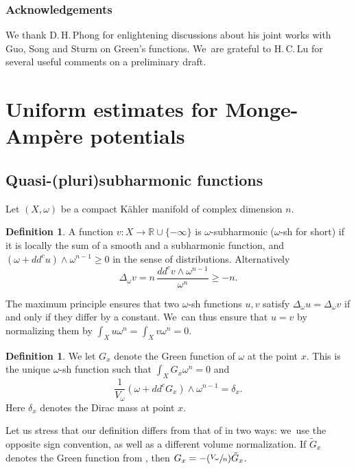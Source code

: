 \documentclass[10pt]{amsart}
\newcommand{\Psfrac}[2]{(\sfrac{#1}{#2})}
\theoremstyle{definition}
\newtheorem{defi}[theorem]{Definition}
\newcommand{\R}{\mathbb R}
\begin{document}
\subsubsection*{Acknowledgements}
We thank D.\,H.\,Phong for enlightening discussions about his joint works with Guo, Song and Sturm on Green's functions. We~are grateful to H.\,C.\,Lu for several useful comments on a preliminary draft.

\section{Uniform estimates for Monge-Ampère potentials}

\subsection{Quasi-(pluri)subharmonic functions}

Let $(X, \omega)$ be a compact Kähler manifold of complex dimension $n$.


\begin{defi}
A function $v:X \rightarrow \R \cup \{-\infty\}$
is $\omega$-subharmonic ($\omega$-sh for short) if it is locally the sum of a smooth and a subharmonic function, and
$(\omega+dd^c u) \wedge \omega^{n-1} \geq 0$ in the sense of distributions.
Alternatively
\[
\Delta_{\omega} v=n\, \frac{dd^c v \wedge \omega^{n-1}}{\omega^n} \geq -n.
\]
\end{defi}

The maximum principle ensures that two $\omega$-sh functions $u,v$ satisfy $\Delta_{\omega} u=\Delta_{\omega} v$ if and only if they differ by a constant. We~can thus ensure that $u=v$ by normalizing them
by $\int_X u \omega^n=\int_X v \omega^n=0$.

\begin{defi} \label{def:green}
We let $G_x$ denote the Green function of $\omega$ at the point $x$.
This is the unique $\omega$-sh function such that $\int_X G_x \omega^n=0$ and
\[
\frac{1}{V_{\omega}} (\omega+dd^c G_x) \wedge \omega^{n-1}=\delta_x.
\]
Here $\delta_x$ denotes the Dirac mass at point $x$.
\end{defi}

Let us stress that our definition differs from that
of \cite{GPSS22} in two ways: we~use the opposite sign convention, as well as a different volume normalization.
If $\tilde{G}_x$ denotes the Green function from \cite{GPSS22}, then
$G_x=-\Psfrac{V_{\omega}}{n}\tilde{G}_x$.
\end{document}
